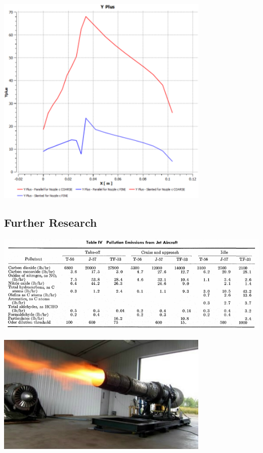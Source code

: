 \documentclass[12pt]{article} %
\begin{document}
\begin{center}
    \includegraphics[width=4in]{YPlus_C.png}
    \label{fig:YPlusC}
\end{center}


\subsection{Further Research}
\begin{center}
    \includegraphics[width=\linewidth]{JetPollutionTable.png}
    \label{tab:pollution}
\end{center}

\begin{center}
    \includegraphics[width=4in]{JetExhaustPic.png}
    \label{fig:jetexhaust}
\end{center}
\end{document}
